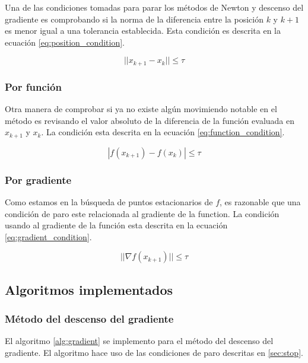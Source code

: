Una de las condiciones tomadas para parar los métodos de Newton y descenso del gradiente es comprobando si la norma de la diferencia entre la posición $k$ y $k+1$ es menor igual a una tolerancia establecida. Esta condición es descrita en la ecuación \ref{eq:position_condition}.

\begin{equation}
    ||x_{k+1}-x_{k}|| \leq \tau \label{eq:position_condition}
\end{equation}

\subsubsection{Por función}

Otra manera de comprobar si ya no existe algún movimiendo notable en el método es revisando el valor absoluto de la diferencia de la función evaluada en $x_{k+1}$ y $x_k$. La condición esta descrita en la ecuación \ref{eq:function_condition}.

\begin{equation}
    |f(x_{k+1})-f(x_k)| \leq \tau \label{eq:function_condition}
\end{equation}

\subsubsection{Por gradiente}

Como estamos en la búsqueda de puntos estacionarios de $f$, es razonable que una condición de paro este relacionada al gradiente de la function. La condición usando al gradiente de la función esta descrita en la ecuación \ref{eq:gradient_condition}.

\begin{equation}
    ||\nabla f (x_{k+1})|| \leq \tau \label{eq:gradient_condition}
\end{equation}


\subsection{Algoritmos implementados}



\subsubsection{Método del descenso del gradiente}

El algoritmo \ref{alg:gradient} se implemento para el método del descenso del gradiente. El algoritmo hace uso de las condiciones de paro descritas en \ref{sec:stop}.

